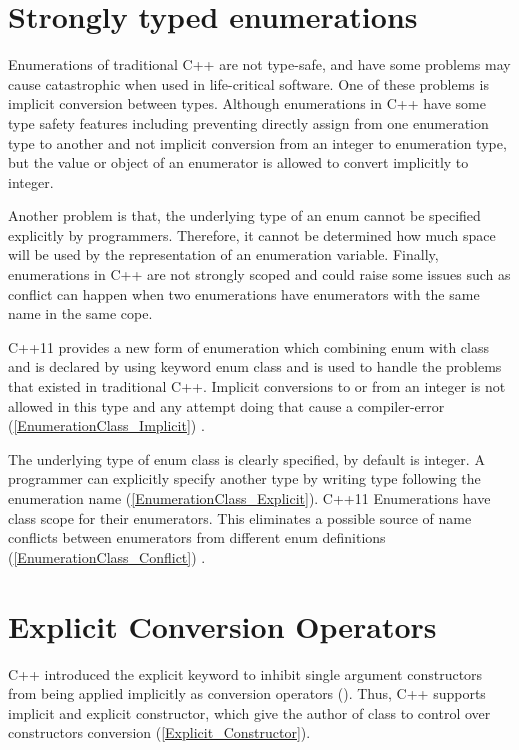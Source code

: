 \documentclass[11pt]{report}
\begin{document}
\section{Strongly typed enumerations}
\label{section: Strongly typed enumerations}
Enumerations of traditional C++ are not type-safe, and have some problems may cause catastrophic when used in life-critical software. One of these problems is implicit conversion between types. Although enumerations in C++ have some type safety features including preventing directly assign from one enumeration type to another and not implicit conversion from an integer to enumeration type, but the value or object of an enumerator is allowed to convert implicitly to integer.


Another problem is that, the underlying type of an enum cannot be specified explicitly by programmers. Therefore, it cannot be determined how much space will be used by the representation of an enumeration variable. Finally, enumerations in C++ are not strongly scoped and could raise some issues such as conflict can happen when two enumerations have enumerators with the same name in the same cope\cite{Stroustrup:2012:Cpp11}.


C++11 provides a new form of enumeration which combining enum with class and is declared by using keyword enum class and is used to handle the problems that existed in traditional C++.  Implicit conversions to or from an integer is not allowed in this type and any attempt doing that cause a compiler-error (\ref{EnumerationClass_Implicit}) \cite{Overland:2011:CWF}.


The underlying type of enum class is clearly specified, by default is integer.  A programmer can explicitly specify another type by writing type following the enumeration name (\ref{EnumerationClass_Explicit}). C++11 Enumerations have class scope for their enumerators. This eliminates a possible source of name conflicts between enumerators from different enum definitions (\ref{EnumerationClass_Conflict}) \cite{Josuttis:2012:CppStandard}.


\section{Explicit Conversion Operators}
\label{section: Explicit Conversion Operators}
C++ introduced the explicit keyword to inhibit single argument constructors from being applied implicitly as conversion operators (\cite{Gregorie:professionalcpp}). Thus, C++ supports implicit and explicit constructor, which give the author of class to control over constructors conversion (\ref{Explicit_Constructor}).
\end{document}
